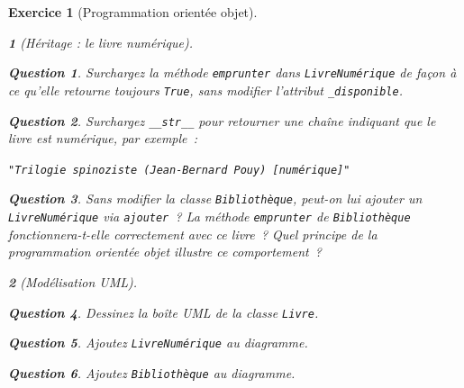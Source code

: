 \documentclass{article}
\theoremstyle{exostyle}
\newtheorem{exo}{Exercice}
\theoremstyle{partiestyle}
\newtheorem{partie}{}[exo]
\theoremstyle{questionstyle}
\newtheorem{questionpartie}{Question}[partie]
\begin{document}
\begin{exo}[Programmation orientée objet]
\begin{partie}[Héritage : le livre numérique]
        \begin{questionpartie}
            Surchargez la méthode \texttt{emprunter} dans \texttt{LivreNumérique} de façon à ce qu'elle retourne toujours \texttt{True}, sans modifier l'attribut \texttt{\_disponible}.
        \end{questionpartie}

        \begin{questionpartie}
            Surchargez \texttt{\_\_str\_\_} pour retourner une chaîne indiquant que le livre est numérique, par exemple~:
            \begin{center}
                \texttt{"Trilogie spinoziste (Jean-Bernard Pouy) [numérique]"}
            \end{center}
        \end{questionpartie}

        \begin{questionpartie}
            Sans modifier la classe \texttt{Bibliothèque}, peut-on lui ajouter un \texttt{LivreNumérique} via \texttt{ajouter}~? La méthode \texttt{emprunter} de \texttt{Bibliothèque} fonctionnera-t-elle correctement avec ce livre~? Quel principe de la programmation orientée objet illustre ce comportement~?
        \end{questionpartie}

    \end{partie}

    \begin{partie}[Modélisation UML]

        \begin{questionpartie}
            Dessinez la boîte UML de la classe \texttt{Livre}.
        \end{questionpartie}

        \begin{questionpartie}
            Ajoutez \texttt{LivreNumérique} au diagramme.
        \end{questionpartie}

        \begin{questionpartie}
            Ajoutez \texttt{Bibliothèque} au diagramme.
        \end{questionpartie}

    \end{partie}
\end{exo}
\end{document}
